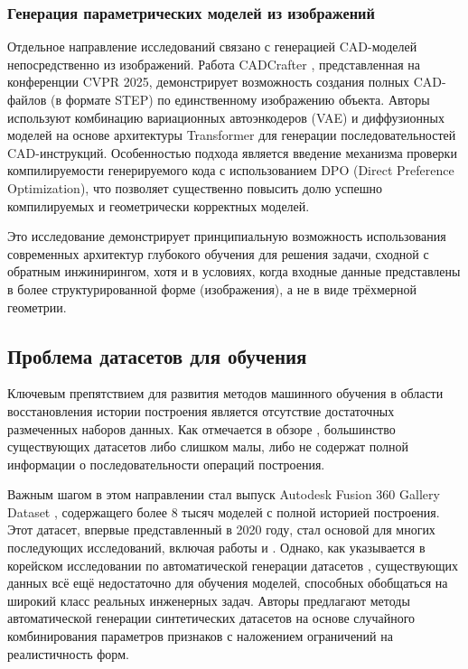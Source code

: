 \subsubsection{Генерация параметрических моделей из изображений}

Отдельное направление исследований связано с генерацией CAD-моделей непосредственно из изображений. Работа CADCrafter \cite{chen2025cadcrafter}, представленная на конференции CVPR 2025, демонстрирует возможность создания полных CAD-файлов (в формате STEP) по единственному изображению объекта. Авторы используют комбинацию вариационных автоэнкодеров (VAE) и диффузионных моделей на основе архитектуры Transformer для генерации последовательностей CAD-инструкций. Особенностью подхода является введение механизма проверки компилируемости генерируемого кода с использованием DPO (Direct Preference Optimization), что позволяет существенно повысить долю успешно компилируемых и геометрически корректных моделей.

Это исследование демонстрирует принципиальную возможность использования современных архитектур глубокого обучения для решения задачи, сходной с обратным инжинирингом, хотя и в условиях, когда входные данные представлены в более структурированной форме (изображения), а не в виде трёхмерной геометрии.

\subsection{Проблема датасетов для обучения}

Ключевым препятствием для развития методов машинного обучения в области восстановления истории построения является отсутствие достаточных размеченных наборов данных. Как отмечается в обзоре \cite{steininger2025enhancing}, большинство существующих датасетов либо слишком малы, либо не содержат полной информации о последовательности операций построения.

Важным шагом в этом направлении стал выпуск Autodesk Fusion 360 Gallery Dataset \cite{autodesk2020fusion}, содержащего более 8 тысяч моделей с полной историей построения. Этот датасет, впервые представленный в 2020 году, стал основой для многих последующих исследований, включая работы \cite{dupont2025design} и \cite{chen2025cadcrafter}. Однако, как указывается в корейском исследовании по автоматической генерации датасетов \cite{kim2024automatic}, существующих данных всё ещё недостаточно для обучения моделей, способных обобщаться на широкий класс реальных инженерных задач. Авторы предлагают методы автоматической генерации синтетических датасетов на основе случайного комбинирования параметров признаков с наложением ограничений на реалистичность форм.

